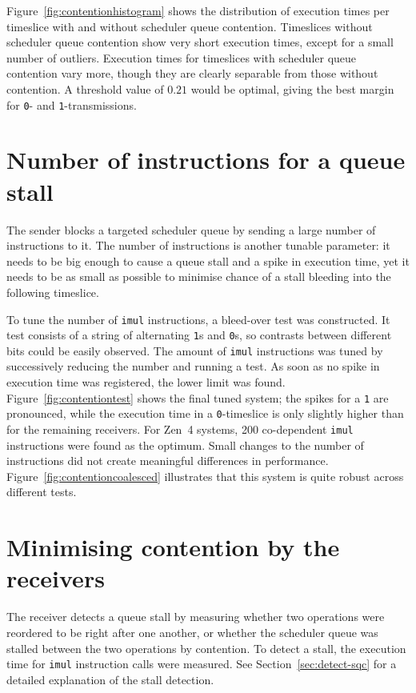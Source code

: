 \documentclass[11pt,
  titlepage=false,
]{scrreprt}
\begin{document}
Figure~\ref{fig:contentionhistogram} shows the distribution of execution times per timeslice with and without scheduler queue contention.
Timeslices without scheduler queue contention show very short execution times, except for a small number of outliers.
Execution times for timeslices with scheduler queue contention vary more, though they are clearly separable from those without contention.
A threshold value of $0.21$ would be optimal, giving the best margin for \texttt{0}- and \texttt{1}-transmissions.


\section{Number of instructions for a queue stall}
The sender blocks a targeted scheduler queue by sending a large number of instructions to it.
The number of instructions is another tunable parameter:
it needs to be big enough to cause a queue stall and a spike in execution time,
yet it needs to be as small as possible to minimise chance of a stall bleeding into the following timeslice.

To tune the number of \texttt{imul} instructions, a bleed-over test was constructed.
It test consists of a string of alternating \texttt{1}s and \texttt{0}s, so contrasts between different bits could be easily observed.
The amount of \texttt{imul} instructions was tuned by successively reducing the number and running a test.
As soon as no spike in execution time was registered, the lower limit was found.
Figure~\ref{fig:contentiontest} shows the final tuned system;
the spikes for a \texttt{1} are pronounced, while the execution time in a \texttt{0}-timeslice is only slightly higher than for the remaining receivers.
For Zen~4 systems, 200 co-dependent \texttt{imul} instructions were found as the optimum.
Small changes to the number of instructions did not create meaningful differences in performance.
Figure~\ref{fig:contentioncoalesced} illustrates that this system is quite robust across different tests.

\section{Minimising contention by the receivers}
\label{sec:reducecontention}
The receiver detects a queue stall by measuring whether two operations were reordered to be right after one another,
or whether the scheduler queue was stalled between the two operations by contention.
To detect a stall, the execution time for \texttt{imul} instruction calls were measured.
See Section~\ref{sec:detect-sqc} for a detailed explanation of the stall detection.
\end{document}
